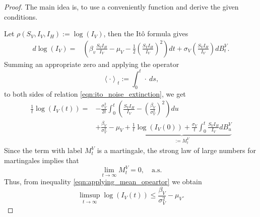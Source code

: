 \begin{proof}
    The main idea is, to use a conveniently function and derive the 
    given conditions. 
    
    Let $\rho (S_V, I_V, I_H):= \log (I_V)$, then the It\^{o} formula 
    gives
    \begin{equation} \label{eqn:ito_noise_extinction}
        \begin{aligned}
            d \log(I_V) = & 
                \left(
                    \beta_v \frac{S_V I_H}{ I_V} - \mu_V
                    - \frac{1}{2}
                    \left(
                        \frac{S_V I_H}{I_V}
                    \right) ^ 2
                \right) dt
                 + \sigma_V 
                \left(
                    \frac{S_V I_H}{ I_V}
                \right) dB_t ^ V.
        \end{aligned}
    \end{equation}
    Summing an appropriate zero and applying the operator
    $$
        \left < \cdot \right >_t
        := 
        \int_{0} ^ t
            \cdot \ ds,
    $$
    to both sides of relation \eqref{eqn:ito_noise_extinction}, we get
    \begin{equation} \label{eqn:applying_mean_opeartor}
        \begin{aligned}
            \frac{1}{t} \log(I_V(t))
            =&
            - 
            \frac{\sigma_V ^ 2}{2t}
            \int_{0} ^ {t}
                \left(
                    \frac{S_V I_H}{I_V} 
                    -
                    \left(
                        \frac{\beta_V}{\sigma_V ^ 2}
                    \right) ^ 2
                \right)
            du
            \\
            & + 
            \frac{\beta_V}{\sigma_V ^ 2}
            - 
            \mu_V 
            + 
            \underbrace{
                \frac{1}{t} \log(I_V(0))
                +
                \frac{\sigma_V}{t}
                \int_{0}^t
                    \frac{S_V I_H}{I_V}
                    dB_u^V
            }_{:=M_t^V}                  
        \end{aligned}
    \end{equation}
%
    Since the term with label $M_t^V$ is a martingale, 
    the strong law of large numbers for martingales \cite{Mao} implies that
    $$
        \lim_{t \to \infty} M_t^V = 0, \quad \text{a.s.}
    $$
    Thus, from inequality \eqref{eqn:applying_mean_opeartor} we obtain
    \begin{equation}\label{eqn:bound_vector_noise}
        \limsup_{t \to \infty} \log(I_V(t)) 
            \leq
            \frac{\beta_V}{\sigma_V^2} - \mu_V.           
    \end{equation}
\end{proof}
%
%
%
%
